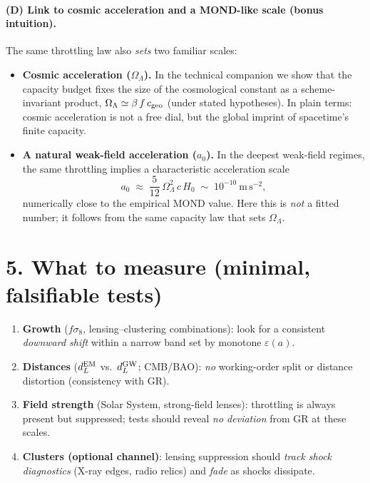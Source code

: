 \documentclass[aps,prd,onecolumn,superscriptaddress,nofootinbib]{revtex4-2}
\newcommand{\OmL}{\Omega_\Lambda}
\newcommand{\eps}{\varepsilon}
\newcommand{\cgeo}{c_{\rm geo}}
\begin{document}
\medskip
\paragraph*{(D) Link to cosmic acceleration and a MOND-like scale (bonus intuition).}
The same throttling law also \emph{sets} two familiar scales:
\begin{itemize}
\item \textbf{Cosmic acceleration (\(\OmL\)).} In the technical companion we show that the capacity budget fixes the size of the cosmological constant as a scheme-invariant product, $\OmL \simeq \beta\,f\,\cgeo$ (under stated hypotheses). In plain terms: cosmic acceleration is not a free dial, but the global imprint of spacetime’s finite capacity.
\item \textbf{A natural weak-field acceleration (\(a_0\)).} In the deepest weak-field regimes, the same throttling implies a characteristic acceleration scale
\[
a_0 \;\approx\; \frac{5}{12}\,\OmL^2\,c\,H_0 \;\sim\; 10^{-10}\ \mathrm{m\,s^{-2}},
\]
numerically close to the empirical MOND value. Here this is \emph{not} a fitted number; it follows from the same capacity law that sets $\OmL$.
\end{itemize}

\section*{5. What to measure (minimal, falsifiable tests)}
\begin{enumerate}
\item \textbf{Growth} ($f\sigma_8$, lensing--clustering combinations): look for a consistent \emph{downward shift} within a narrow band set by monotone $\eps(a)$.
\item \textbf{Distances} ($d_L^{\rm EM}$ vs.\ $d_L^{\rm GW}$; CMB/BAO): \emph{no} working-order split or distance distortion (consistency with GR).
\item \textbf{Field strength} (Solar System, strong-field lenses): throttling is always present but suppressed; tests should reveal \emph{no deviation} from GR at these scales.
\item \textbf{Clusters (optional channel)}: lensing suppression should \emph{track shock diagnostics} (X-ray edges, radio relics) and \emph{fade} as shocks dissipate.
\end{enumerate}
\end{document}
